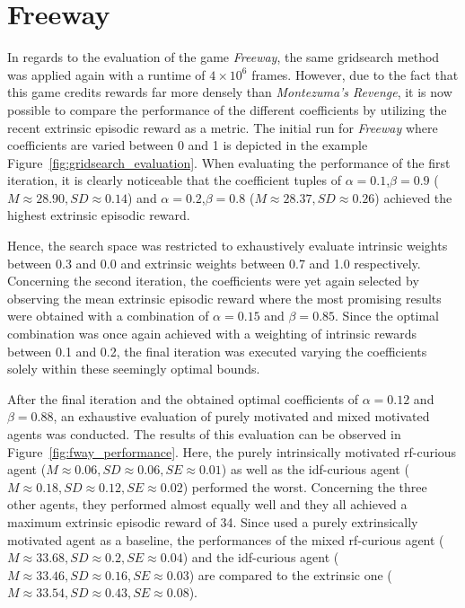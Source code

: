 \documentclass[draft,final]{vutinfth} %
\begin{document}
    \section{Freeway}
    In regards to the evaluation of the game \textit{Freeway}, the same gridsearch method was applied again with a runtime of $4\times10^6$ frames.
    However, due to the fact that this game credits rewards far more densely than \textit{Montezuma's Revenge}, it is now possible to compare the performance of the different coefficients by utilizing the recent extrinsic episodic reward as a metric.
    The initial run for \textit{Freeway} where coefficients are varied between 0 and 1 is depicted in the example Figure~\ref{fig:gridsearch_evaluation}.
    When evaluating the performance of the first iteration, it is clearly noticeable that the coefficient tuples of $\alpha=0.1$,$\beta=0.9$ ($M\approx28.90,SD\approx0.14$) and $\alpha=0.2$,$\beta=0.8$ ($M\approx28.37,SD\approx0.26$) achieved the highest extrinsic episodic reward.

    Hence, the search space was restricted to exhaustively evaluate intrinsic weights between 0.3 and 0.0 and extrinsic weights between 0.7 and 1.0 respectively.
    Concerning the second iteration, the coefficients were yet again selected by observing the mean extrinsic episodic reward where the most promising results were obtained with a combination of $\alpha=0.15$ and $\beta=0.85$.
    Since the optimal combination was once again achieved with a weighting of intrinsic rewards between 0.1 and 0.2, the final iteration was executed varying the coefficients solely within these seemingly optimal bounds.

    After the final iteration and the obtained optimal coefficients of $\alpha=0.12$ and $\beta=0.88$, an exhaustive evaluation of purely motivated and mixed motivated agents was conducted.
    The results of this evaluation can be observed in Figure~\ref{fig:fway_performance}.
    Here, the purely intrinsically motivated \gls{rf}-curious agent ($M\approx0.06,SD\approx0.06,SE\approx0.01$) as well as the \gls{idf}-curious agent ($M\approx0.18,SD\approx0.12,SE\approx0.02$) performed the worst.
    Concerning the three other agents, they performed almost equally well and they all achieved a maximum extrinsic episodic reward of 34.
    Since \citet{burda_large-scale_2018-1} used a purely extrinsically motivated agent as a baseline, the performances of the mixed \gls{rf}-curious agent ($M\approx33.68,SD\approx0.2,SE\approx0.04$) and the \gls{idf}-curious agent ($M\approx33.46,SD\approx0.16,SE\approx0.03$) are compared to the extrinsic one ($M\approx33.54,SD\approx0.43,SE\approx0.08$).
\end{document}

